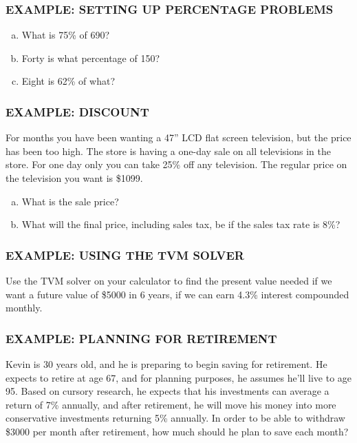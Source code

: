 \documentclass[8pt]{beamer}
\newcommand{\extitle}[1]{\frametitle{\fontfamily{fvs}\selectfont \small\color{black!70!blue!80!cyan}\uppercase{\bfseries Example: #1}}}
\newenvironment{exsol}
{
\begin{tcolorbox}[colframe=black!50!blue!50!cyan,
colback=white,
bottomrule=0mm,
rightrule=0mm,
sharp corners=all] 

}
{ \end{tcolorbox}}
\begin{document}
\begin{frame}
\extitle{Setting up Percentage Problems}
\begin{enumerate}[(a)]
\item What is 75\% of 690?
\item Forty is what percentage of 150?
\item Eight is 62\% of what?
\end{enumerate}

\begin{exsol}
\vspace{2.5in}
\text{}
\end{exsol}
\end{frame}

\begin{frame}
\extitle{Discount}
For months you have been wanting a 47'' LCD flat screen television, but the price has been too high. The store is having a one-day sale on all televisions in the store. For one day only you can take 25\% off any television. The regular price on the television
you want is \$1099.
\begin{enumerate}[(a)]
\item What is the sale price?
\item What will the final price, including sales tax, be if the sales tax rate is 8\%?
\end{enumerate}

\begin{exsol}
\vspace{2.5in}
\text{}
\end{exsol}
\end{frame}

\begin{frame}
\extitle{Using the TVM Solver}
Use the TVM solver on your calculator to find the present value needed if we want a future value of \$5000 in 6 years, if we can earn 4.3\% interest compounded monthly.

\begin{exsol}
\vspace{3in}
\text{}
\end{exsol}
\end{frame}

\begin{frame}
\extitle{Planning for Retirement}
Kevin is 30 years old, and he is preparing to begin saving for retirement.  He expects to retire at age 67, and for planning purposes, he assumes he'll live to age 95.  Based on cursory research, he expects that his investments can average a return of 7\% annually, and after retirement, he will move his money into more conservative investments returning 5\% annually.  In order to be able to withdraw \$3000 per month after retirement, how much should he plan to save each month?

\begin{exsol}
\vspace{3in}
\text{}
\end{exsol}
\end{frame}
\end{document}
